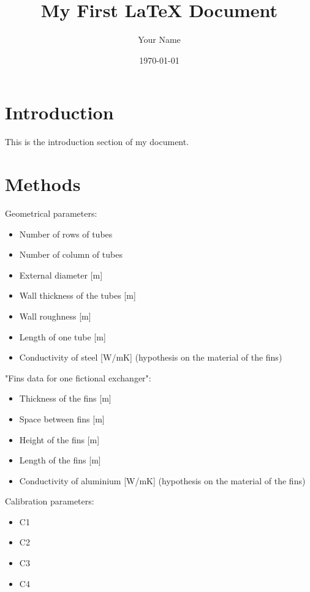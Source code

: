 \documentclass{article}
\begin{document}
\title{My First LaTeX Document}
\author{Your Name}
\date{\today}

\maketitle

\section{Introduction}
This is the introduction section of my document.

\section{Methods}
Geometrical parameters:
\begin{itemize}
    \item Number of rows of tubes
    \item Number of column of tubes
    \item External diameter [m]
    \item Wall thickness of the tubes [m]
    \item Wall roughness [m]
    \item Length of one tube [m]
    \item Conductivity of steel [W/mK] (hypothesis on the material of the fins)
\end{itemize}
"Fins data for one fictional exchanger":
\begin{itemize}
    \item Thickness of the fins [m]
    \item Space between fins [m] %
    \item Height of the fins [m] %
    \item Length of the fins [m]
    \item Conductivity of aluminium [W/mK] (hypothesis on the material of the fins)
\end{itemize}

Calibration parameters:
\begin{itemize}
    \item C1
    \item C2
    \item C3
    \item C4
\end{itemize}
\end{document}
